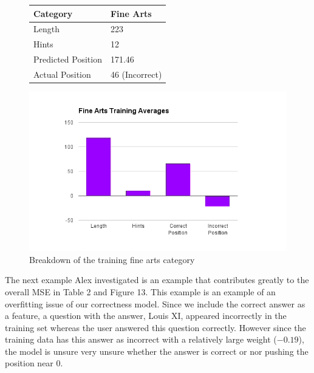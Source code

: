 \documentclass[letterpaper]{article}
\begin{document}
\begin{figure}
\centering
\begin{minipage}[t]{.4\textwidth}
\centering
\vspace{0pt}

\begin{tabular}{|l|l |}
\hline
Category & Fine Arts \\ \hline
Length &  223 \\
Hints & 12 \\
Predicted Position & 171.46 \\
Actual Position & 46 (Incorrect) \\ \hline

\end{tabular}
\label{table:ex_art}
\end{minipage}\hfill
\begin{minipage}[t]{.4\textwidth}
\centering
\vspace{0pt}
\includegraphics[width=\textwidth]{finearts.png}
\caption{Breakdown of the training fine arts category}
\label{fig:mircoFA}
\end{minipage}

\end{figure}

The next example Alex investigated is an example that contributes greatly to the overall MSE in Table 2 and Figure 13.  This example is an example of an overfitting issue of our correctness model.  Since we include the correct answer as a feature, a question with the answer, Louis XI, appeared incorrectly in the training set whereas the user answered this question correctly.  However since the training data has this answer as incorrect with a relatively large weight ($-0.19$), the model is unsure very unsure whether the answer is correct or nor pushing the position near $0$. 
\end{document}
